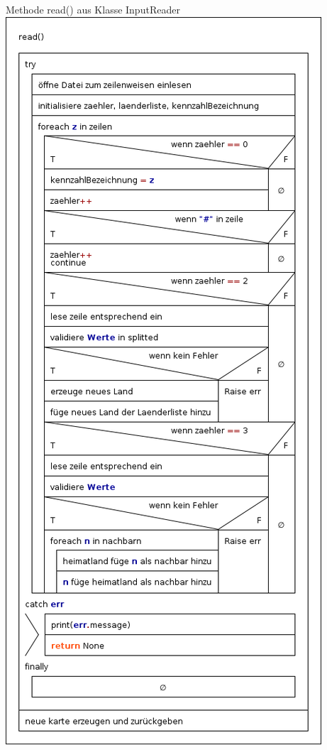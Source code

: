 \documentclass[a4paper,11pt]{article}
\begin{document}
{\begin{center}
\vbox{
	Methode read() aus Klasse InputReader\\
	\includegraphics[scale=0.5]{read.png}
}
\end{center}
}
\end{document}
